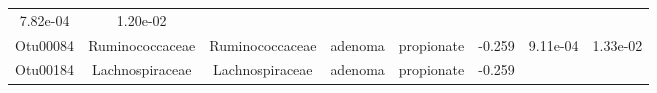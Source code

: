 \documentclass[11pt,]{article}
\begin{document}
\begin{longtable}[]{@{}cccccccc@{}}
\begin{minipage}[t]{0.08\columnwidth}
7.82e-04\strut
\end{minipage} & \begin{minipage}[t]{0.08\columnwidth}\centering\strut
1.20e-02\strut
\end{minipage}\tabularnewline
\begin{minipage}[t]{0.08\columnwidth}\centering\strut
Otu00084\strut
\end{minipage} & \begin{minipage}[t]{0.15\columnwidth}\centering\strut
Ruminococcaceae\strut
\end{minipage} & \begin{minipage}[t]{0.15\columnwidth}\centering\strut
Ruminococcaceae\strut
\end{minipage} & \begin{minipage}[t]{0.08\columnwidth}\centering\strut
adenoma\strut
\end{minipage} & \begin{minipage}[t]{0.09\columnwidth}\centering\strut
propionate\strut
\end{minipage} & \begin{minipage}[t]{0.07\columnwidth}\centering\strut
-0.259\strut
\end{minipage} & \begin{minipage}[t]{0.08\columnwidth}\centering\strut
9.11e-04\strut
\end{minipage} & \begin{minipage}[t]{0.08\columnwidth}\centering\strut
1.33e-02\strut
\end{minipage}\tabularnewline
\begin{minipage}[t]{0.08\columnwidth}\centering\strut
Otu00184\strut
\end{minipage} & \begin{minipage}[t]{0.15\columnwidth}\centering\strut
Lachnospiraceae\strut
\end{minipage} & \begin{minipage}[t]{0.15\columnwidth}\centering\strut
Lachnospiraceae\strut
\end{minipage} & \begin{minipage}[t]{0.08\columnwidth}\centering\strut
adenoma\strut
\end{minipage} & \begin{minipage}[t]{0.09\columnwidth}\centering\strut
propionate\strut
\end{minipage} & \begin{minipage}[t]{0.07\columnwidth}\centering\strut
-0.259\strut
\end{minipage} & \begin{minipage}[t]{0.08\columnwidth}\centering\strut

\end{minipage}
\end{longtable}
\end{document}

